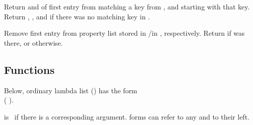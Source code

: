 \begin{LIST}{1cm}
  {
  Return  and  of first entry from 
  matching a key from , and  starting with that key. Return \retval{\NIL},
  \retvalii{\NIL}, and  \retvaliii{\NIL} if there was no matching key
  in .
  }

  {
  Remove first entry  from property list stored in
  /in , respectively. Return \retval{\T} if 
  was there, or \retval{\NIL} otherwise.
  }

\end{LIST}


\subsection{Functions}
\label{section:Functions}

\begin{flushleft}
  Below, ordinary lambda list () has the form\\
  (
  ).
\end{flushleft}
   is \T\ if there is a corresponding
  argument.  forms can refer to any  and
   to their left.

